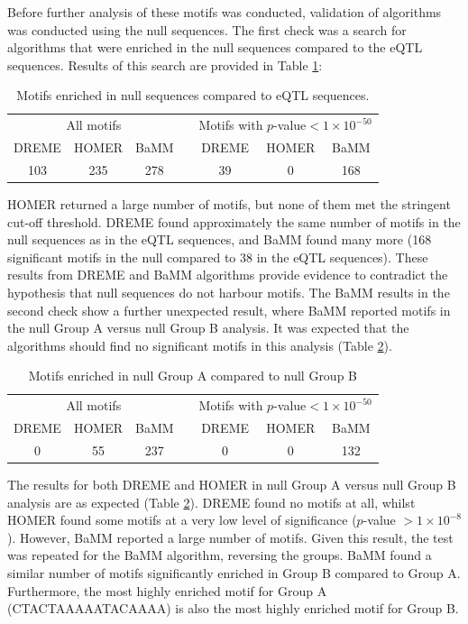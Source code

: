 \documentclass[12pt]{article}
\begin{document}
Before further analysis of these motifs was conducted, validation of algorithms was conducted using the null sequences. The first check was a search for algorithms that were enriched in the null sequences compared to the eQTL sequences. Results of this search are provided in Table \ref{nullMotifNumbers}:

\begin{table}[!htbp]
\caption{Motifs enriched in null sequences compared to eQTL sequences.}
\label{nullMotifNumbers}
\centering
\begin{tabular}{ccccccc}
\toprule[0.2em]
\multicolumn{3}{c}{All motifs} & & \multicolumn{3}{c}{Motifs with $p$-value$<1\times10^{-50}$}\\
\cmidrule[0.1em]{1-3}
\cmidrule[0.1em]{5-7}
DREME & HOMER & BaMM && DREME & HOMER & BaMM\\
103 & 235 & 278 && 39 & 0 & 168\\
\bottomrule[0.2em]
\end{tabular}
\end{table}

HOMER returned a large number of motifs, but none of them met the stringent cut-off threshold. DREME found approximately the same number of motifs in the null sequences as in the eQTL sequences, and BaMM found many more (168 significant motifs in the null compared to 38 in the eQTL sequences). These results from DREME and BaMM algorithms provide evidence to contradict the hypothesis that null sequences do not harbour motifs. 
\newpage
The BaMM results in the second check show a further unexpected result, where BaMM reported motifs in the null Group A versus null Group B analysis. It was expected that the algorithms should find no significant motifs in this analysis (Table \ref{nullHalfGroups}).

\begin{table}[!htbp]
\caption{Motifs enriched in null Group A compared to null Group B}
\label{nullHalfGroups}
\centering
\begin{tabular}{ccccccc}
\toprule[0.2em]
\multicolumn{3}{c}{All motifs} & & \multicolumn{3}{c}{Motifs with $p$-value$<1\times10^{-50}$}\\
\cmidrule[0.1em]{1-3}
\cmidrule[0.1em]{5-7}
DREME & HOMER & BaMM && DREME & HOMER & BaMM\\
0 & 55 & 237 && 0 & 0 & 132\\
\bottomrule[0.2em]
\end{tabular}
\end{table}

The results for both DREME and HOMER in null Group A versus null Group B analysis are as expected (Table \ref{nullHalfGroups}). DREME found no motifs at all, whilst HOMER found some motifs at a very low level of significance ($p$-value $>1\times10^{-8}$). However, BaMM reported a large number of motifs. Given this result, the test was repeated for the BaMM algorithm, reversing the groups. BaMM found a similar number of motifs significantly enriched in Group B compared to Group A. Furthermore, the most highly enriched motif for Group A (CTACTAAAAATACAAAA) is also the most highly enriched motif for Group B.
\end{document}
